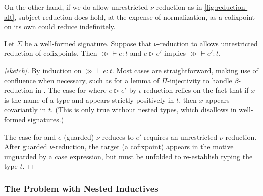 On the other hand, if we do allow unrestricted $\nu$-reduction as in \autoref{fig:reduction-alt}, subject reduction does hold,
at the expense of normalization,
as a cofixpoint on its own could reduce indefinitely.

\begin{theorem}
  \label{thm:metatheory:sr}
  Let $\Sigma$ be a well-formed signature.
  Suppose that $\nu$-reduction to allows unrestricted reduction of cofixpoints.
  Then $\gg \vdash e : t$ and $e \rhd e'$ implies $\gg \vdash e' : t$.
\end{theorem}

\begin{proof}[{[sketch]}]
  By induction on $\gg \vdash e : t$.  Most cases are straightforward,
  making use of confluence when necessary, such as for a lemma of
  $\Pi$-injectivity to handle $\beta$-reduction in .
  The case for  where $e \rhd e'$ by $\iota$-reduction relies on the fact that
  if $x$ is the name of a \coinductive type and appears strictly positively in $t$,
  then $x$ appears covariantly in $t$.
  (This is only true without nested \coinductive types, which \lang disallows in well-formed signatures.)

  The case for  and $e$ (guarded) $\nu$-reduces to $e'$ requires an unrestricted $\nu$-reduction.
  After guarded $\nu$-reduction, the target (a cofixpoint) appears in the motive unguarded by a case expression, but must be unfolded to re-establish typing the type $t$.
\end{proof}

\subsubsection{The Problem with Nested Inductives}

\newcommand{\nat}{\const{N}}

